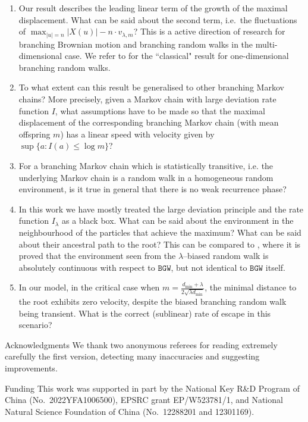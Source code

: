 \documentclass[11 pt]{article}
\theoremstyle{definition}
\numberwithin{equation}{section}
\begin{document}
\begin{enumerate}

\item  Our result describes the leading linear term of the growth of the maximal displacement. What can be said about the second term, i.e.\ the fluctuations of $\max_{|u|=n} |X(u)| - n \cdot v_{\lambda, m}$? This is a active direction of research for branching Brownian motion and branching random walks in the multi-dimensional case. We refer to \cite{aidekon_convergence_2013} for the ``classical" result for one-dimensional branching random walks.

	\item
	To what extent can this result be generalised to other branching Markov chains? More precisely, given a Markov chain with large deviation rate function $I$, what assumptions have to be made so that the maximal displacement of the corresponding branching Markov chain (with mean offspring $m$) has a linear speed with velocity given by $\sup\{ a: I(a)\leq  \log m \}$?
	
	\item For a branching Markov chain which is statistically transitive, i.e. the underlying Markov chain is a random walk in a  homogeneous random environment, is it true in general that there is no weak recurrence phase?

	\item
	In this work we have mostly treated the large deviation principle and the rate function $I_\lambda$ as a black box. What can be said about the environment in the neighbourhood of the particles that achieve the maximum? What can be said about their ancestral path to the root? This can be compared to \cite{aidekon_speed_2014}, where it is proved that the environment seen from the $\lambda$--biased random walk is absolutely continuous with respect to $\mathtt{BGW}$, but not identical  to $\mathtt{BGW}$ itself.  
	
	\item In our model, in the critical case when $m = \frac{d_{\min}+\lambda}{2\sqrt{\lambda d_{\min}}}$, the minimal distance to the root exhibits zero velocity, despite the biased branching random walk being transient. What is the correct (sublinear) rate of escape in this scenario?
\end{enumerate}

\bigskip

\begin{paragraph}{Acknowledgments}
	We thank two anonymous referees for reading extremely carefully the first version, detecting many inaccuracies and suggesting improvements.
\end{paragraph}


\begin{paragraph}{Funding}
	This work was supported in part by the National Key R\&D Program of China (No.\ 2022YFA1006500), EPSRC grant EP/W523781/1, and National Natural Science Foundation of China (No.\ 12288201 and 12301169). 
\end{paragraph}

 

\end{document}
